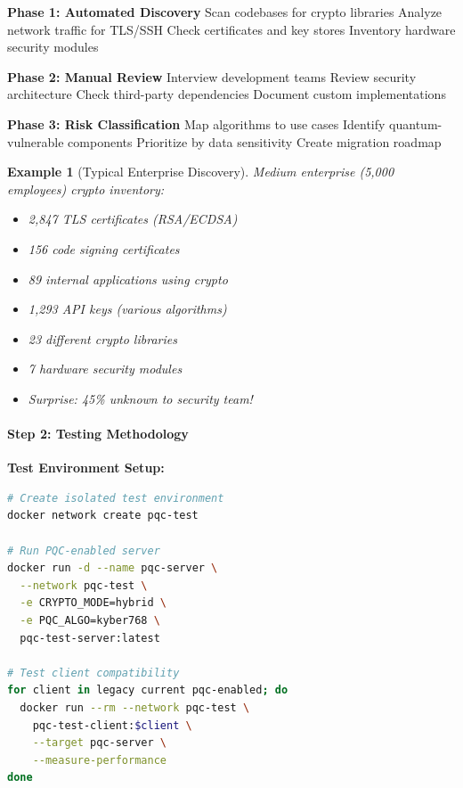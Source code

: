 \documentclass[11pt,a4paper]{article}
\newtheorem{example}{Example}
\begin{document}
\begin{algorithm}
\caption{Crypto Discovery Process}
\label{alg:crypto-discovery}
\begin{algorithmic}[1]
\State \textbf{Phase 1: Automated Discovery}
\State \quad Scan codebases for crypto libraries
\State \quad Analyze network traffic for TLS/SSH
\State \quad Check certificates and key stores
\State \quad Inventory hardware security modules

\State \textbf{Phase 2: Manual Review}
\State \quad Interview development teams
\State \quad Review security architecture
\State \quad Check third-party dependencies
\State \quad Document custom implementations

\State \textbf{Phase 3: Risk Classification}
\State \quad Map algorithms to use cases
\State \quad Identify quantum-vulnerable components
\State \quad Prioritize by data sensitivity
\State \quad Create migration roadmap
\end{algorithmic}
\end{algorithm}

\begin{example}[Typical Enterprise Discovery]
Medium enterprise (5,000 employees) crypto inventory:
\begin{itemize}
    \item 2,847 TLS certificates (RSA/ECDSA)
    \item 156 code signing certificates
    \item 89 internal applications using crypto
    \item 1,293 API keys (various algorithms)
    \item 23 different crypto libraries
    \item 7 hardware security modules
    \item Surprise: 45\% unknown to security team!
\end{itemize}
\end{example}

\paragraph{Step 2: Testing Methodology}

\textbf{Test Environment Setup:}

\begin{lstlisting}[language=bash, caption=PQC Testing Framework]
# Create isolated test environment
docker network create pqc-test

# Run PQC-enabled server
docker run -d --name pqc-server \
  --network pqc-test \
  -e CRYPTO_MODE=hybrid \
  -e PQC_ALGO=kyber768 \
  pqc-test-server:latest

# Test client compatibility
for client in legacy current pqc-enabled; do
  docker run --rm --network pqc-test \
    pqc-test-client:$client \
    --target pqc-server \
    --measure-performance
done
\end{lstlisting}
\end{document}
